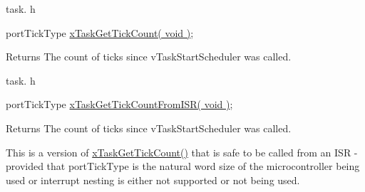 task. h 
\begin{DoxyPre}portTickType \hyperlink{tasks_8c_a50ca04677e139ae017188939edc33144}{xTaskGetTickCount( void )};\end{DoxyPre}


\begin{DoxyReturn}{Returns}
The count of ticks since v\-Task\-Start\-Scheduler was called.
\end{DoxyReturn}
task. h 
\begin{DoxyPre}portTickType \hyperlink{tasks_8c_aa1ecfd8dd05e4f5d0b825ce1b45cb388}{xTaskGetTickCountFromISR( void )};\end{DoxyPre}


\begin{DoxyReturn}{Returns}
The count of ticks since v\-Task\-Start\-Scheduler was called.
\end{DoxyReturn}
This is a version of \hyperlink{task_8h_a25ba1c4490c7e3ae11bc1e25192b12dc}{x\-Task\-Get\-Tick\-Count()} that is safe to be called from an I\-S\-R -\/ provided that port\-Tick\-Type is the natural word size of the microcontroller being used or interrupt nesting is either not supported or not being used. 